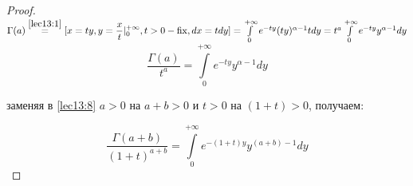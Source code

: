 \documentclass[../../main.tex]{subfiles}
\begin{document}
\begin{proof}
	$\Gamma(a) \stk{lec13:1}= [x=ty, y = \dfrac{x}{t}|^{+\infty}_0, t > 0 - \fix, dx = 
	t dy] = 
	\int\limits_0^{+\infty}e^{-ty}(ty)^{\alpha-1}tdy = t^a 
	\int\limits_0^{+\infty}e^{-ty}y^{\alpha-1}dy$
	\begin{equation}
		\label{lec13:9}
		\dfrac{\Gamma(a)}{t^a}=\int\limits_0^{+\infty}e^{-ty}y^{\alpha-1}dy
	\end{equation}
	
	заменяя в \eqref{lec13:8} $a > 0$ на $a+b > 0$ и $t > 0$ на $(1+t) > 0$, 
	получаем:
	
	\begin{equation}
	\label{lec13:10}
	\dfrac{\Gamma(a+b)}{(1+t)^{a+b}} = \int\limits_0^{+\infty} e^{-(1+t)y} y^{(a+b) - 
	1} dy
	\end{equation}
\end{proof}
\end{document}
